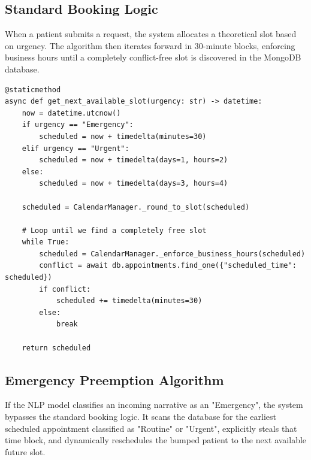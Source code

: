 \documentclass[12pt,a4paper]{report}
\begin{document}
\subsection{Standard Booking Logic}
When a patient submits a request, the system allocates a theoretical slot based on urgency. The algorithm then iterates forward in 30-minute blocks, enforcing business hours until a completely conflict-free slot is discovered in the MongoDB database.

\begin{verbatim}
@staticmethod
async def get_next_available_slot(urgency: str) -> datetime:
    now = datetime.utcnow()
    if urgency == "Emergency":
        scheduled = now + timedelta(minutes=30)
    elif urgency == "Urgent":
        scheduled = now + timedelta(days=1, hours=2)
    else:
        scheduled = now + timedelta(days=3, hours=4)
        
    scheduled = CalendarManager._round_to_slot(scheduled)
        
    # Loop until we find a completely free slot
    while True:
        scheduled = CalendarManager._enforce_business_hours(scheduled)
        conflict = await db.appointments.find_one({"scheduled_time": scheduled})
        if conflict:
            scheduled += timedelta(minutes=30)
        else:
            break
            
    return scheduled
\end{verbatim}

\subsection{Emergency Preemption Algorithm}
If the NLP model classifies an incoming narrative as an "Emergency", the system bypasses the standard booking logic. It scans the database for the earliest scheduled appointment classified as "Routine" or "Urgent", explicitly steals that time block, and dynamically reschedules the bumped patient to the next available future slot.
\end{document}
